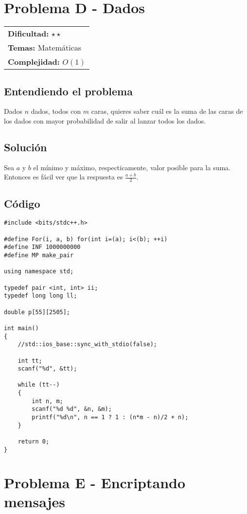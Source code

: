 \section{Problema D - Dados}

\hfill
\begin{tabular}{@{}l@{}}
\textbf{Dificultad:} $\star \star$ \\
\textbf{Temas:} Matemáticas \\
\textbf{Complejidad:} $O(1)$
\end{tabular}

\subsection*{Entendiendo el problema}
Dados $n$ dados, todos con $m$ caras, quieres saber cuál es la suma de las caras de los dados con mayor probabilidad de salir al lanzar todos los dados.
\subsection*{Solución}
Sea $a$ y $b$ el mínimo y máximo, respecticamente, valor posible para la suma. Entonces es fácil ver que la respuesta es $\displaystyle \frac{a+b}{2}$.
\subsection*{Código}
\begin{verbatim}
#include <bits/stdc++.h>
 
#define For(i, a, b) for(int i=(a); i<(b); ++i)
#define INF 1000000000
#define MP make_pair
 
using namespace std;
 
typedef pair <int, int> ii;
typedef long long ll;
 
double p[55][2505];
 
int main()
{
    //std::ios_base::sync_with_stdio(false);
     
    int tt;
    scanf("%d", &tt);
 
    while (tt--)
    {
        int n, m;
        scanf("%d %d", &n, &m);
        printf("%d\n", n == 1 ? 1 : (n*m - n)/2 + n);
    }
 
    return 0;
}
\end{verbatim}

\section{Problema E - Encriptando mensajes}

